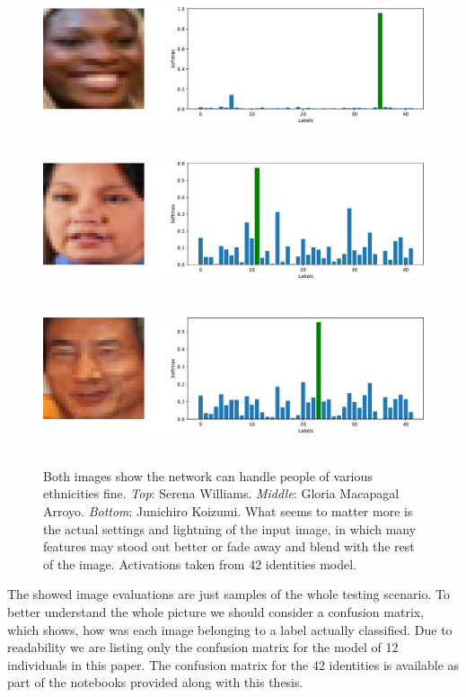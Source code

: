 \begin{figure}[ht]
    \centering
    \includegraphics[height=12em]{obrazky-figures/predicted_316_ok.pdf}
    \vspace{1em}
    \includegraphics[height=12em]{obrazky-figures/predicted_218_ok.pdf}
    \vspace{1em}
    \includegraphics[height=12em]{obrazky-figures/predicted_255_ok.pdf}
    \caption{Both images show the network can handle people of various ethnicities fine. \textit{Top}: Serena Williams. \textit{Middle}: Gloria Macapagal Arroyo. \textit{Bottom}: Junichiro Koizumi. What seems to matter more is the actual settings and lightning of the input image, in which many features may stood out better or fade away and blend with the rest of the image. Activations taken from 42 identities model.}
    \label{fig:serena}
\end{figure}

The showed image evaluations are just samples of the whole testing scenario. To better understand the whole picture we should consider a confusion matrix, which shows, how was each image belonging to a label actually classified. Due to readability we are listing only the confusion matrix for the model of 12 individuals in this paper. The confusion matrix for the 42 identities is available as part of the notebooks provided along with this thesis.

